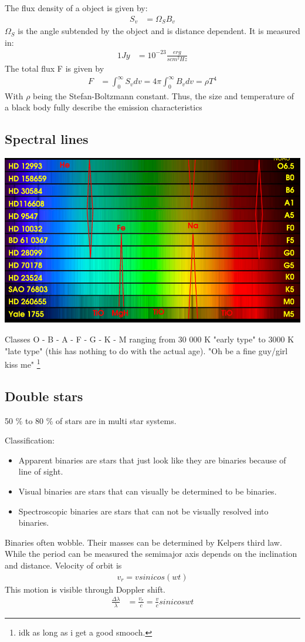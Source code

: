 \documentclass[11pt,a4paper]{article}
\begin{document}
The flux density of a object is given by:
\begin{align*}
    S_v &= \Omega_S B_v 
\end{align*}
$\Omega_S$ is the angle subtended by the object and is distance dependent. 
It is measured in: 
\begin{align*}
    1Jy &= 10^{-23} \frac {erg}{s cm^2 Hz} 
\end{align*}
The total flux F is given by 
\begin{align*}
    F &= \int_0^\infty S_v dv = 4 \pi \int_0^\infty B_v dv = \rho T^4
\end{align*}
With $\rho$ being the Stefan-Boltzmann constant.
Thus, the size and temperature of a black body fully describe the emission characteristics
\subsection{Spectral lines}
\begin{center}
    \includegraphics[width=0.6\linewidth]{screenshot_2024-01-19-192210.png}
\end{center}
Classes O - B - A - F - G - K - M ranging from 30 000 K "early type" to 3000 K "late type" (this has nothing to do with the actual age).
"Oh be a fine guy/girl kiss me" \footnote{idk as long as i get a good smooch.}
\subsection{Double stars}
50 $\%$ to 80 $\%$ of stars are in multi star systems.

Classification:  
\begin{itemize}
    \item  
    Apparent binaries are stars that just look like they are binaries because of line of sight. 
    \item 
    Visual binaries are stars that can visually be determined to be binaries.
    \item 
    Spectroscopic binaries are stars that can not be visually resolved into binaries.
\end{itemize}
Binaries often wobble. 
Their masses can be determined by Kelpers third law.
While the period can be measured the semimajor axis depends on the inclination and distance.
Velocity of orbit is 
\begin{align*}
    v_r = v sin i cos (wt)    
\end{align*}
This motion is visible through Doppler shift.
\begin{align*}
    \frac {\Delta \lambda}{\lambda} &= \frac {v_r}{c} = \frac {v}{c} sin i cos wt 
\end{align*}
\end{document}
